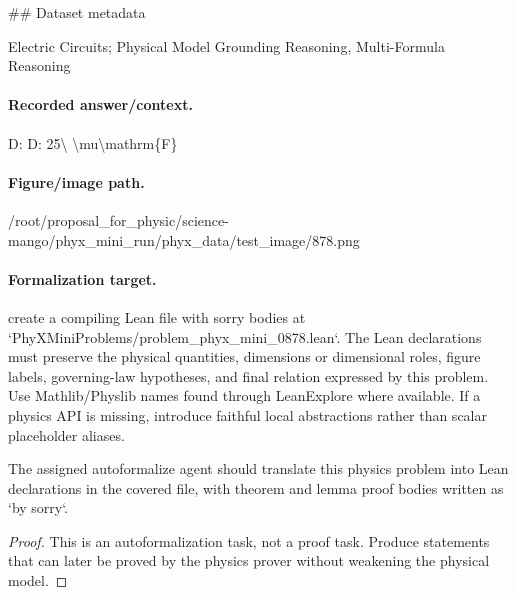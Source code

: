 \#\# Dataset metadata

Electric Circuits; Physical Model Grounding Reasoning, Multi-Formula Reasoning

\paragraph{Recorded answer/context.}
D: D: 25\textbackslash{} \textbackslash{}mu\textbackslash{}mathrm\{F\}

\paragraph{Figure/image path.}
/root/proposal\_for\_physic/science-mango/phyx\_mini\_run/phyx\_data/test\_image/878.png

\paragraph{Formalization target.}
create a compiling Lean file with sorry bodies at `PhyXMiniProblems/problem\_phyx\_mini\_0878.lean`. The Lean declarations must preserve the physical quantities, dimensions or dimensional roles, figure labels, governing-law hypotheses, and final relation expressed by this problem.
Use Mathlib/Physlib names found through LeanExplore where available. If a physics API is missing, introduce faithful local abstractions rather than scalar placeholder aliases.

\begin{theorem}
\label{thm:physics:phyx_mini_0878:target}
The assigned autoformalize agent should translate this physics problem into Lean declarations in the covered file, with theorem and lemma proof bodies written as `by sorry`.
\end{theorem}
\begin{proof}
This is an autoformalization task, not a proof task. Produce statements that can later be proved by the physics prover without weakening the physical model.
\end{proof}

